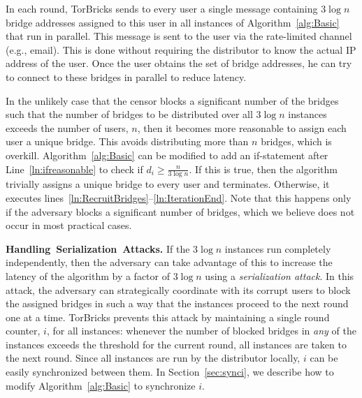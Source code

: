 \documentclass[letterpaper,twocolumn,10pt]{article}
\newcommand{\fullpaper}[1]{#1}
\newcommand{\fullpaper}[1]{}
\newcommand{\bricks}{}
\def\bricks/{\mbox{TorBricks}}
\newcommand{\sfsize}{\fontsize{0.68\baselineskip}{0.68\baselineskip}\selectfont}
\newcommand{\sans}[1]{\textbf{\textsf{\sfsize \mbox{#1}}}}
\newcommand{\para}[1]{\vspace{0.55em} \noindent \sans{{\mbox{#1}}}}
\begin{document}
In each round, \bricks/ sends to every user a single message containing $3\log{n}$ bridge addresses assigned to this user in all  instances of Algorithm~\ref{alg:Basic} that run in parallel. This message is sent to the user via the rate-limited channel (e.g., email). \fullpaper{This is done without requiring the distributor to know the actual IP address of the user. Once the user obtains the set of bridge addresses, he can try to connect to these bridges in parallel to reduce latency.}

In the unlikely case that the censor blocks a significant number of the bridges such that the number of bridges to be distributed over all $3\log{n}$ instances exceeds the number of users, $n$, then it becomes more reasonable to assign each user a unique bridge. This avoids distributing more than $n$ bridges, which is overkill. 
Algorithm~\ref{alg:Basic} can be modified to add an if-statement after Line~\ref{ln:ifreasonable} to check if ${d_i \geq \frac{n}{3\log{n}}}$. If this is true, then the algorithm trivially assigns a unique bridge to every user and terminates. Otherwise, it executes lines~\ref{ln:RecruitBridges}--\ref{ln:IterationEnd}.
Note that this happens only if the adversary blocks a significant number of bridges, which we believe does not occur in most practical cases. %

\para{Handling Serialization Attacks.}
If the $3\log{n}$ instances run completely independently, then the adversary can take advantage of this to increase the latency of the algorithm by a factor of $3\log{n}$ using a \emph{serialization attack}. In this attack, the adversary can strategically coordinate with its corrupt users to block the assigned bridges in such a way that the instances proceed to the next round one at a time. 
\bricks/ prevents this attack by maintaining a single round counter, $i$, for all instances: whenever the number of blocked bridges in \emph{any} of the instances exceeds the threshold for the current round, all instances are taken to the next round. Since all instances are run by the distributor locally, $i$ can be easily synchronized between them. In Section~\ref{sec:synci}, we describe how to modify Algorithm~\ref{alg:Basic} to synchronize $i$.
\end{document}

